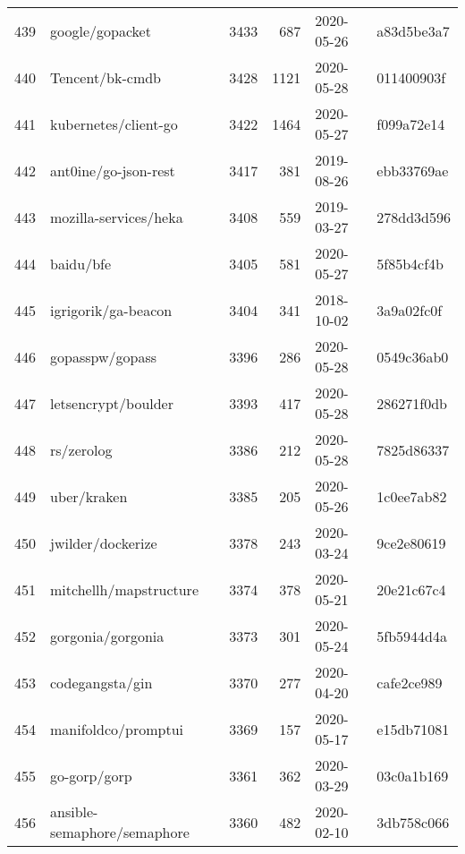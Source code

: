 \begin{longtable}{llrrll}
    439 &                                    google/gopacket &   3433 &    687 & 2020-05-26 &  a83d5be3a7 \\
    440 &                                    Tencent/bk-cmdb &   3428 &   1121 & 2020-05-28 &  011400903f \\
    441 &                               kubernetes/client-go &   3422 &   1464 & 2020-05-27 &  f099a72e14 \\
    442 &                               ant0ine/go-json-rest &   3417 &    381 & 2019-08-26 &  ebb33769ae \\
    443 &                              mozilla-services/heka &   3408 &    559 & 2019-03-27 &  278dd3d596 \\
    444 &                                          baidu/bfe &   3405 &    581 & 2020-05-27 &  5f85b4cf4b \\
    445 &                                igrigorik/ga-beacon &   3404 &    341 & 2018-10-02 &  3a9a02fc0f \\
    446 &                                    gopasspw/gopass &   3396 &    286 & 2020-05-28 &  0549c36ab0 \\
    447 &                                letsencrypt/boulder &   3393 &    417 & 2020-05-28 &  286271f0db \\
    448 &                                         rs/zerolog &   3386 &    212 & 2020-05-28 &  7825d86337 \\
    449 &                                        uber/kraken &   3385 &    205 & 2020-05-26 &  1c0ee7ab82 \\
    450 &                                  jwilder/dockerize &   3378 &    243 & 2020-03-24 &  9ce2e80619 \\
    451 &                             mitchellh/mapstructure &   3374 &    378 & 2020-05-21 &  20e21c67c4 \\
    452 &                                  gorgonia/gorgonia &   3373 &    301 & 2020-05-24 &  5fb5944d4a \\
    453 &                                    codegangsta/gin &   3370 &    277 & 2020-04-20 &  cafe2ce989 \\
    454 &                                manifoldco/promptui &   3369 &    157 & 2020-05-17 &  e15db71081 \\
    455 &                                       go-gorp/gorp &   3361 &    362 & 2020-03-29 &  03c0a1b169 \\
    456 &                        ansible-semaphore/semaphore &   3360 &    482 & 2020-02-10 &  3db758c066 \\

\end{longtable}
